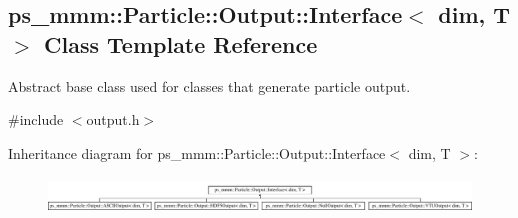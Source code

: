 \hypertarget{classps__mmm_1_1_particle_1_1_output_1_1_interface}{}\subsection{ps\+\_\+mmm\+:\+:Particle\+:\+:Output\+:\+:Interface$<$ dim, T $>$ Class Template Reference}
\label{classps__mmm_1_1_particle_1_1_output_1_1_interface}


Abstract base class used for classes that generate particle output.  




{\ttfamily \#include $<$output.\+h$>$}

Inheritance diagram for ps\+\_\+mmm\+:\+:Particle\+:\+:Output\+:\+:Interface$<$ dim, T $>$\+:\begin{figure}[H]
\begin{center}
\leavevmode
\includegraphics[height=0.952381cm]{classps__mmm_1_1_particle_1_1_output_1_1_interface}
\end{center}
\end{figure}
